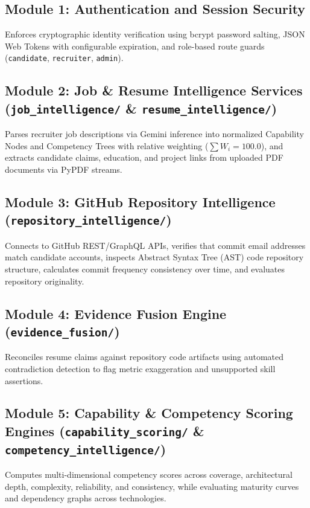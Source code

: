 \subsection{Module 1: Authentication and Session Security}
Enforces cryptographic identity verification using bcrypt password salting, JSON Web Tokens with configurable expiration, and role-based route guards (\texttt{candidate}, \texttt{recruiter}, \texttt{admin}).

\subsection{Module 2: Job \& Resume Intelligence Services (\texttt{job\_intelligence/} \& \texttt{resume\_intelligence/})}
Parses recruiter job descriptions via Gemini inference into normalized Capability Nodes and Competency Trees with relative weighting ($\sum W_i = 100.0$), and extracts candidate claims, education, and project links from uploaded PDF documents via PyPDF streams.

\subsection{Module 3: GitHub Repository Intelligence (\texttt{repository\_intelligence/})}
Connects to GitHub REST/GraphQL APIs, verifies that commit email addresses match candidate accounts, inspects Abstract Syntax Tree (AST) code repository structure, calculates commit frequency consistency over time, and evaluates repository originality.

\subsection{Module 4: Evidence Fusion Engine (\texttt{evidence\_fusion/})}
Reconciles resume claims against repository code artifacts using automated contradiction detection to flag metric exaggeration and unsupported skill assertions.

\subsection{Module 5: Capability \& Competency Scoring Engines (\texttt{capability\_scoring/} \& \texttt{competency\_intelligence/})}
Computes multi-dimensional competency scores across coverage, architectural depth, complexity, reliability, and consistency, while evaluating maturity curves and dependency graphs across technologies.

